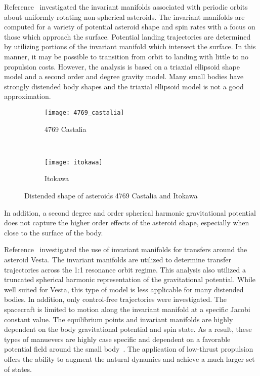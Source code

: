 \documentclass[letterpaper, preprint, paper,11pt]{AAS}	%
\begin{document}
Reference~ investigated the invariant manifolds associated with periodic orbits about uniformly rotating non-spherical asteroids.
The invariant manifolds are computed for a variety of potential asteroid shape and spin rates with a focus on those which approach the surface. 
Potential landing trajectories are determined by utilizing portions of the invariant manifold which intersect the surface. 
In this manner, it may be possible to transition from orbit to landing with little to no propulsion costs. 
However, the analysis is based on a triaxial ellipsoid shape model and a second order and degree gravity model.
Many small bodies have strongly distended body shapes and the triaxial ellipsoid model is not a good approximation.
\begin{figure} 
	\centering 
	\begin{subfigure}[htbp]{0.5\textwidth} 
		\texttt{[image: 4769\_castalia]} 
		\caption{4769 Castalia} \label{fig:castalia} 
	\end{subfigure}~ %
	\begin{subfigure}[htbp]{0.5\textwidth} 
		\texttt{[image: itokawa]} 
		\caption{Itokawa} \label{fig:itokawa} 
	\end{subfigure} 
	\caption{Distended shape of asteroids 4769 Castalia and Itokawa}
	\label{fig:asteroid_shape} 
\end{figure}
In addition, a second degree and order spherical harmonic gravitational potential does not capture the higher order effects of the asteroid shape, especially when close to the surface of the body.

Reference~ investigated the use of invariant manifolds for transfers around the asteroid Vesta.
The invariant manifolds are utilized to determine transfer trajectories across the 1:1 resonance orbit regime.
This analysis also utilized a truncated spherical harmonic representation of the gravitational potential. 
While well suited for Vesta, this type of model is less applicable for many distended bodies.
In addition, only control-free trajectories were investigated.
The spacecraft is limited to motion along the invariant manifold at a specific Jacobi constant value.
The equilibrium points and invariant manifolds are highly dependent on the body gravitational potential and spin state.
As a result, these types of manuevers are highly case specific and dependent on a favorable potential field around the small body~\cite{scheeres2012}.
The application of low-thrust propulsion offers the ability to augment the natural dynamics and achieve a much larger set of states.
\end{document}
